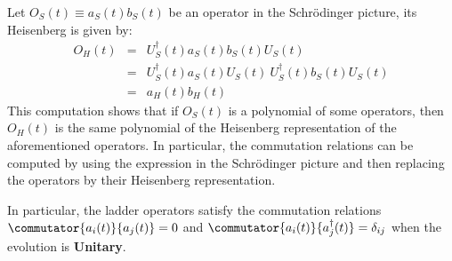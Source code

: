  \begin{remark}
     Let $O_S(t) \equiv a_S(t) b_S(t)$ be an operator in the Schrödinger picture, its Heisenberg is given by:
     \begin{eqnarray}
         O_H(t) &=& U_S^\dagger(t) a_S(t) b_S(t) U_S(t)\nonumber\\
         &=& U_S^\dagger(t) a_S(t) U_S(t) \ U_S^\dagger(t) b_S(t) U_S(t)\nonumber\\
         &=& a_H(t) b_H(t)
     \end{eqnarray}
     This computation shows that if $O_S(t)$ is a polynomial of some operators, then $O_H(t)$ is the same polynomial of the Heisenberg representation of the aforementioned operators. In particular, the commutation relations can be computed by using the expression in the Schrödinger picture and then replacing the operators by their Heisenberg representation.

     In particular, the ladder operators satisfy the commutation relations $\commutator{a_i(t)}{a_j(t)} = 0$ and $\commutator{a_i(t)}{a^\dagger_j(t)} = \delta_{i j}$ when the evolution is \textbf{Unitary}. 
 \end{remark}

